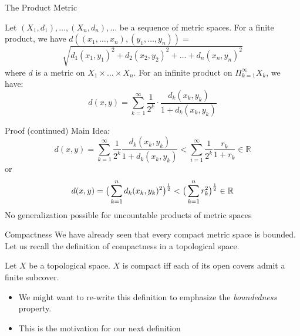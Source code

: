\documentclass[compress, red]{beamer}
\begin{document}
    \begin{frame}{The Product Metric}
        \begin{definition}
            Let $(X_1,d_1),\hdots,(X_n,d_n),\hdots$ be a sequence of metric spaces. 
            For a finite product, we have $d((x_1,\hdots,x_n),(y_1,\hdots,y_n)) = $
            \[ \sqrt{d_1(x_1,y_1)^2 + d_2(x_2,y_2)^2 + \hdots + d_n(x_n,y_n)^2} \]
            where $d$ is a metric on $X_1\times\hdots\times X_n$. For an infinite product on $\Pi_{k=1}^{\infty} X_k$, we have:
            \[ d(x,y) = \sum_{k=1}^{\infty} \frac{1}{2^k} \cdot \frac{d_k(x_k,y_k)}{1+d_k(x_k,y_k)} \]
        \end{definition}
    \end{frame}

    \begin{frame}{Proof (continued)}
        Main Idea:
        \[ d(x,y) = \sum_{k=1}^{\infty} \frac{1}{2^k}\frac{d_k(x_k,y_k)}{1+d_k(x_k,y_k)} < \sum_{i=1}^{\infty} \frac{1}{2^k}\frac{r_k}{1+r_k}\in
            \mathbb{R}\]
        or
        \[ d(x,y) = \big{(}\sum_{k=1}^n d_k(x_k,y_k)^2\big{)}^{\frac{1}{2}} < \big{(}\sum_{k=1}^n r_k^2\big{)}^{\frac{1}{2}} \in \mathbb{R} \]
        No generalization possible for uncountable products of metric spaces
    \end{frame}

    \begin{frame}{Compactness}
        We have already seen that every compact metric space is bounded.\\
        
        Let us recall the definition of compactness in a topological space.
        \begin{definition}
            Let $X$ be a topological space. $X$ is compact iff each of its open covers admit a finite subcover.
        \end{definition}
        \begin{itemize}
            \item<2-> We might want to re-write this definition to emphasize the \textit{boundedness} property. 
            \item<3-> This is the motivation for our next definition
        \end{itemize}
    \end{frame}
\end{document}
